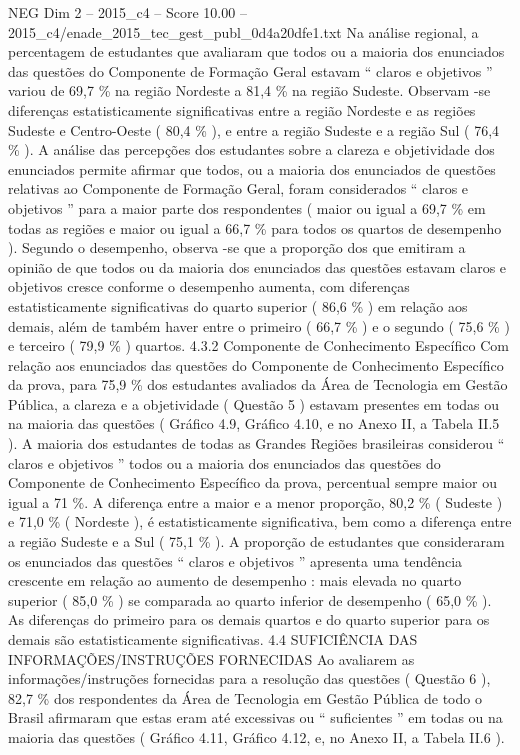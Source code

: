 \begin{textsample}{NEG Dim 2 – 2015\_c4 – Score 10.00 – 2015\_c4/enade\_2015\_tec\_gest\_publ\_0d4a20dfe1.txt}
Na análise regional, a percentagem de estudantes que avaliaram que todos ou a maioria dos enunciados das questões do Componente de Formação Geral estavam “ claros e objetivos ” variou de 69,7 \% na região Nordeste a 81,4 \% na região Sudeste.
Observam -se diferenças estatisticamente significativas entre a região Nordeste e as regiões Sudeste e Centro-Oeste ( 80,4 \% ), e entre a região Sudeste e a região Sul ( 76,4 \% ).
A análise das percepções dos estudantes sobre a clareza e objetividade dos enunciados permite afirmar que todos, ou a maioria dos enunciados de questões relativas ao Componente de Formação Geral, foram considerados “ claros e objetivos ” para a maior parte dos respondentes ( maior ou igual a 69,7 \% em todas as regiões e maior ou igual a 66,7 \% para todos os quartos de desempenho ).
Segundo o desempenho, observa -se que a proporção dos que emitiram a opinião de que todos ou da maioria dos enunciados das questões estavam claros e objetivos cresce conforme o desempenho aumenta, com diferenças estatisticamente significativas do quarto superior ( 86,6 \% ) em relação aos demais, além de também haver entre o primeiro ( 66,7 \% ) e o segundo ( 75,6 \% ) e terceiro ( 79,9 \% ) quartos. 4.3.2 Componente de Conhecimento Específico Com relação aos enunciados das questões do Componente de Conhecimento Específico da prova, para 75,9 \% dos estudantes avaliados da Área de Tecnologia em Gestão Pública, a clareza e a objetividade ( Questão 5 ) estavam presentes em todas ou na maioria das questões ( Gráfico 4.9, Gráfico 4.10, e no Anexo II, a Tabela II.5 ).
A maioria dos estudantes de todas as Grandes Regiões brasileiras considerou “ claros e objetivos ” todos ou a maioria dos enunciados das questões do Componente de Conhecimento Específico da prova, percentual sempre maior ou igual a 71 \%.
A diferença entre a maior e a menor proporção, 80,2 \% ( Sudeste ) e 71,0 \% ( Nordeste ), é estatisticamente significativa, bem como a diferença entre a região Sudeste e a Sul ( 75,1 \% ).
A proporção de estudantes que consideraram os enunciados das questões “ claros e objetivos ” apresenta uma tendência crescente em relação ao aumento de desempenho : mais elevada no quarto superior ( 85,0 \% ) se comparada ao quarto inferior de desempenho ( 65,0 \% ).
As diferenças do primeiro para os demais quartos e do quarto superior para os demais são estatisticamente significativas. 4.4 SUFICIÊNCIA DAS INFORMAÇÕES/INSTRUÇÕES FORNECIDAS Ao avaliarem as informações/instruções fornecidas para a resolução das questões ( Questão 6 ), 82,7 \% dos respondentes da Área de Tecnologia em Gestão Pública de todo o Brasil afirmaram que estas eram até excessivas ou “ suficientes ” em todas ou na maioria das questões ( Gráfico 4.11, Gráfico 4.12, e, no Anexo II, a Tabela II.6 ).

\end{textsample}
